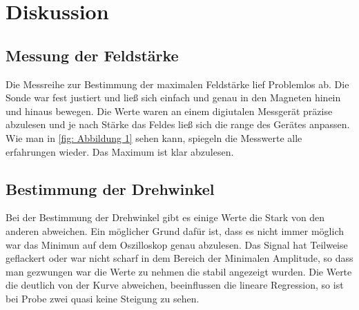 \section{Diskussion}
\label{sec:Diskussion}

\subsection{Messung der Feldstärke}
Die Messreihe zur Bestimmung der maximalen Feldstärke lief Problemlos ab. Die Sonde war fest 
justiert und ließ sich einfach und genau in den Magneten hinein und hinaus bewegen. Die Werte waren 
an einem digiutalen Messgerät präzise abzulesen und je nach Stärke das Feldes ließ sich die range des 
Gerätes anpassen. Wie man in \ref{fig: Abbildung 1} sehen kann, spiegeln die Messwerte alle erfahrungen wieder.
Das Maximum ist klar abzulesen.

\subsection{Bestimmung der Drehwinkel}
Bei der Bestimmung der Drehwinkel gibt es einige Werte die Stark von den anderen abweichen. Ein möglicher 
Grund dafür ist, dass es nicht immer möglich war das Minimun auf dem Oszilloskop genau abzulesen. Das Signal 
hat Teilweise geflackert oder war nicht scharf in dem Bereich der Minimalen Amplitude, so dass man gezwungen war die Werte 
zu nehmen die stabil angezeigt wurden. Die Werte die deutlich von der Kurve abweichen, beeinflussen die lineare Regression,
so ist bei Probe zwei quasi keine Steigung zu sehen.
